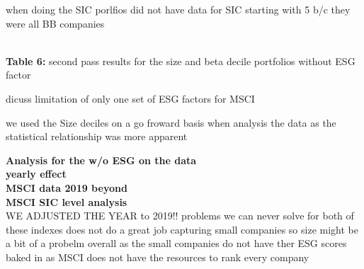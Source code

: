 

when doing the SIC porlfios did not have data for SIC starting with 5 b/c they were all BB companies 
 
 \begin{center}
    \paperspacingnarrow
    \\
    \textbf{Table 6:} second pass results for the size and beta decile portfolios without ESG factor\\
    \paperspacingwide
\end{center}

 
 dicuss limitation of only one set of ESG factors for MSCI 
 
 we used the Size deciles on a go froward basis when analysis the data as the statistical relationship was more apparent 
 
 \textbf{Analysis for the w/o ESG on the data}\\
 \textbf{yearly effect}\\
 
 \textbf{MSCI data 2019 beyond}\\
 
 \textbf{MSCI SIC level analysis}\\
 WE ADJUSTED THE YEAR to 2019!!
 problems we can never solve for both of these indexes does not do a great job capturing small companies so size might be a bit of a probelm overall as the small companies do not have ther ESG scores baked in as MSCI does not have the resources to rank every company